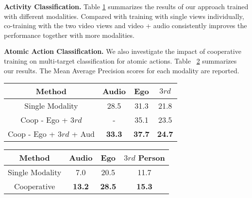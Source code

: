 \documentclass[final]{cvpr}
\begin{document}
\noindent\textbf{Activity Classification.} Table \ref{table:modalities-video_level} summarizes the results of our approach trained with different modalities. Compared with training with single views individually, co-training with the two video views and video + audio consistently improves the performance together with more modalities.

\noindent\textbf{Atomic Action Classification.} We also investigate the impact of cooperative training on multi-target classification for atomic actions. Table ~\ref{table:modes+atomic} summarizes our results. The Mean Average Precision scores for each modality are reported.

\begin{table}[tb]
    \centering
    \renewcommand{\arraystretch}{1.0}
    \renewcommand{\tabcolsep}{2mm}
    \centering
    \small
    \begin{tabular}{c|c|c|c} 
        \toprule
        Method & Audio & Ego & $3rd$ \\
        \midrule    
         Single Modality          & 28.5 & 31.3 & 21.8 \\
         Coop - Ego + $3rd$       & -    & 35.1 & 23.5 \\
         Coop - Ego + $3rd$ + Aud & \textbf{33.3} & \textbf{37.7} & \textbf{24.7} \\
      \bottomrule
    \end{tabular}
    \normalsize
    \vspace{-10pt}
    \label{table:modalities-video_level}
\end{table}

\begin{table}[tb]
    \centering
    \renewcommand{\arraystretch}{1.0}
    \renewcommand{\tabcolsep}{2mm}
    \centering
    \small
        \begin{tabular}{c|c|c|c}
        \toprule
        Method & Audio & Ego & $3rd$ Person \\
        \midrule
         Single Modality  & 7.0  & 20.5 & 11.7 \\
         Cooperative & \textbf{13.2} & \textbf{28.5} & \textbf{15.3} \\
        \bottomrule
        \end{tabular}
        \normalsize
        \vspace{-5pt}
        \label{table:modes+atomic}
        \vspace{-10pt}
\end{table}
\end{document}

